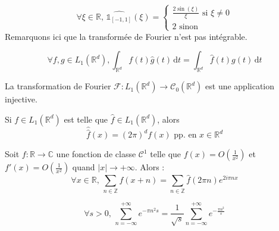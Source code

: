   \begin{example}
    \[
    \forall \xi \in \mathbb{R}, \, \widehat{\mathbb{1}_{[-1,1]}}(\xi) =
    \begin{cases}
      \frac{2 \sin(\xi)}{\xi} \text{ si } \xi \neq 0 \\
      2 \text{ sinon}
    \end{cases}
    \]
    Remarquons ici que la transformée de Fourier n'est pas intégrable.
  \end{example}

  \begin{theorem}
    \[ \forall f, g \in L_1(\mathbb{R}^d), \int_{\mathbb{R}^d} f(t) \widehat{g}(t) \, \mathrm{d}t = \int_{\mathbb{R}^d} \widehat{f}(t) g(t) \, \mathrm{d}t \]
  \end{theorem}

  \begin{corollary}
    La transformation de Fourier $\mathcal{F} : L_1(\mathbb{R}^d) \rightarrow \mathcal{C}_0(\mathbb{R}^d)$ est une application injective.
  \end{corollary}

  \begin{theorem}
    Si $f \in L_1(\mathbb{R}^d)$ est telle que $\widehat{f} \in L_1(\mathbb{R}^d)$, alors
    \[ \widehat{\widehat{f}}(x) = (2\pi)^d f(x) \text{ pp. en } x \in \mathbb{R}^d \]
  \end{theorem}


  \begin{theorem}
    Soit $f : \mathbb{R} \rightarrow \mathbb{C}$ une fonction de classe $\mathcal{C}^1$ telle que $f(x) = O \left( \frac{1}{x^2} \right)$ et $f'(x) = O \left( \frac{1}{x^2} \right)$ quand $|x| \longrightarrow +\infty$. Alors :
    \[ \forall x \in \mathbb{R}, \, \sum_{n \in \mathbb{Z}} f(x+n) = \sum_{n \in \mathbb{Z}} \widehat{f}(2 \pi n) e^{2 i \pi n x} \]
  \end{theorem}

  \begin{application}
    \[ \forall s > 0, \, \sum_{n=-\infty}^{+\infty} e^{-\pi n^2 s} = \frac{1}{\sqrt{s}} \sum_{n=-\infty}^{+\infty} e^{-\frac{\pi n^2}{s}} \]
  \end{application}

